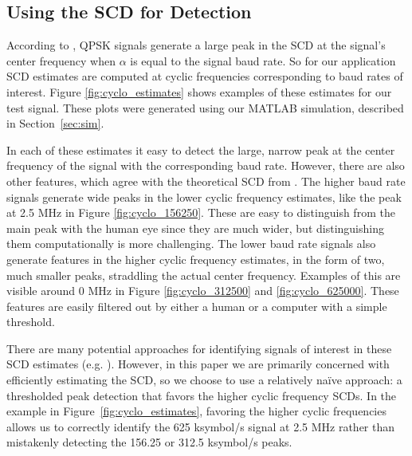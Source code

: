 \documentclass[12pt]{article}
\begin{document}
\subsection{Using the SCD for Detection}
According to \cite{Gardner2}, QPSK signals generate a large peak in the SCD at
the signal's center frequency when $\alpha$ is equal to the signal baud rate.
So for our application SCD estimates are computed at cyclic frequencies
corresponding to baud rates of interest. Figure \ref{fig:cyclo_estimates} shows
examples of these estimates for our test signal. These plots were generated
using our MATLAB simulation, described in Section~\ref{sec:sim}.

In each of these estimates it easy to detect the large, narrow peak at the
center frequency of the signal with the corresponding baud rate. However, there
are also other features, which agree with the theoretical SCD from
\cite{Gardner2}.  The higher baud rate signals generate wide peaks in the lower
cyclic frequency estimates, like the peak at 2.5 MHz in Figure
\ref{fig:cyclo_156250}. These are easy to distinguish from the main peak with
the human eye since they are much wider, but distinguishing them computationally
is more challenging. The lower baud rate signals also generate features in the
higher cyclic frequency estimates, in the form of two, much smaller peaks,
straddling the actual center frequency. Examples of this are visible around 0 MHz
in Figure \ref{fig:cyclo_312500} and \ref{fig:cyclo_625000}. These features are
easily filtered out by either a human or a computer with a simple threshold.

There are many potential approaches for identifying signals of interest in
these SCD estimates (e.g. \cite{Thai1,Yoo1}). However, in this paper we are
primarily concerned with efficiently estimating the SCD, so we choose to use
a relatively na{\"i}ve approach: a thresholded peak detection that favors the
higher cyclic frequency SCDs. In the example in
Figure~\ref{fig:cyclo_estimates}, favoring the higher cyclic frequencies allows
us to correctly identify the 625 ksymbol/s signal at
2.5 MHz rather than mistakenly detecting the 156.25 or 312.5 ksymbol/s peaks.
\end{document}

